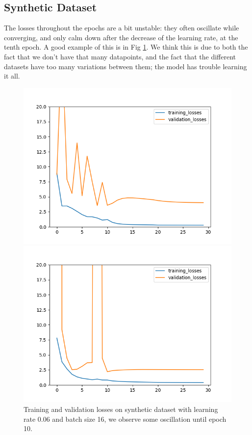 \documentclass[10pt,conference]{IEEEtran}
\begin{document}
\subsection{Synthetic Dataset}
The losses throughout the epochs are a bit unstable: they often oscillate while converging, and only calm down after the decrease of the learning rate, at the tenth epoch. A good example of this is in Fig \ref{figure:oscillations}. We think this is due to both the fact that we don't have that many datapoints, and the fact that the different datasets have too many variations between them; the model has trouble learning it all. \par

\begin{figure}[h]
  \centering
  \begin{minipage}[h]{0.2\textwidth}
    \includegraphics[width=\textwidth]{images/oscillations.png}
    \caption{Training and validation losses on synthetic dataset with learning rate 0.06 and batch size 16, we observe some oscillation until epoch 10.}
    \label{figure:oscillations}
  \end{minipage}
  \hfill
  \begin{minipage}[h]{0.2\textwidth}
    \includegraphics[width=\textwidth]{images/example_high_lr.png}

\end{minipage}
\end{figure}
\end{document}
